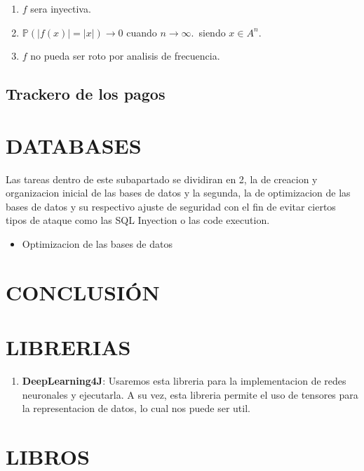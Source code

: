 \documentclass{article}
\theoremstyle{definition}
\begin{document}
\begin{enumerate}
    \item $f$ sera inyectiva.
    \item $\mathbb{P}\left(|f(x)|=|x|\right) \to 0$ cuando $n \to \infty$.\, siendo $x \in A^n$.
    \item $f$ no pueda ser roto por analisis de frecuencia.
\end{enumerate}

\subsection{Trackero de los pagos}

\section{DATABASES}


Las tareas dentro de este subapartado se dividiran en 2, la de creacion y organizacion inicial de las bases de datos y la segunda, la de optimizacion de las bases de datos y su respectivo ajuste de seguridad con el fin de evitar ciertos tipos de ataque como las SQL Inyection o las code execution.


\begin{itemize}
    \item Optimizacion de las bases de datos
\end{itemize}





\section{CONCLUSIÓN}


\section{LIBRERIAS}

\begin{enumerate}
    \item \textbf{DeepLearning4J}: Usaremos esta libreria para la implementacion de redes neuronales y ejecutarla. A su vez, esta libreria permite el uso de tensores para la representacion de datos, lo cual nos puede ser util.
\end{enumerate}

\section{LIBROS}
\end{document}
